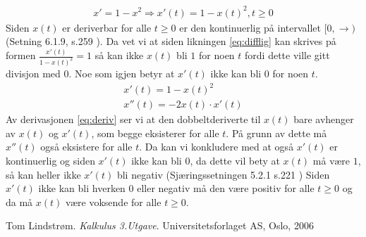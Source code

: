 \documentclass[11pt,norsk]{article}
\begin{document}
				\begin{flushleft}
					\begin{align}
x' = 1 - x^2 \Rightarrow x'(t) = 1 - x(t)^2, t \ge 0 \nonumber
					\end{align}
Siden $x(t)$ er deriverbar for alle $t \ge 0$ er den kontinuerlig på intervallet $[0, \rightarrow)$ (Setning 6.1.9, s.259 \cite{kalkulus}). Da vet vi at siden likningen \eqref{eq:difflig} kan skrives på formen $\frac{x'(t)}{1 - x(t)^2} = 1$ så kan ikke $x(t)$ bli $1$ for noen $t$ fordi dette ville gitt divisjon med $0$. Noe som igjen betyr at $x'(t)$ ikke kan bli $0$ for noen $t$.
				\begin{align}
x'(t) = 1 - x(t)^2 \label{eq:deriv}\\
x''(t) = -2x(t)\cdot x'(t) \nonumber
				\end{align}
Av derivasjonen \eqref{eq:deriv} ser vi at den dobbeltderiverte til $x(t)$ bare avhenger av $x(t)$ og $x'(t)$, som begge eksisterer for alle $t$. På grunn av dette må $x''(t)$ også eksistere for alle $t$. Da kan vi konkludere med at også $x'(t)$ er kontinuerlig og siden $x'(t)$ ikke kan bli $0$, da dette vil bety at $x(t)$ må være $1$, så kan heller ikke $x'(t)$ bli negativ (Sjæringssetningen 5.2.1 s.221 \cite{kalkulus}) Siden $x'(t)$ ikke kan bli hverken $0$ eller negativ må den være positiv for alle $t \ge 0$ og da må $x(t)$ være voksende for alle $t \ge 0$.
				\end{flushleft}
	\begin{thebibliography}{9}
Tom Lindstrøm.
\textit{Kalkulus 3.Utgave}.
Universitetsforlaget AS, Oslo, 2006
	\end{thebibliography}
\end{document}
